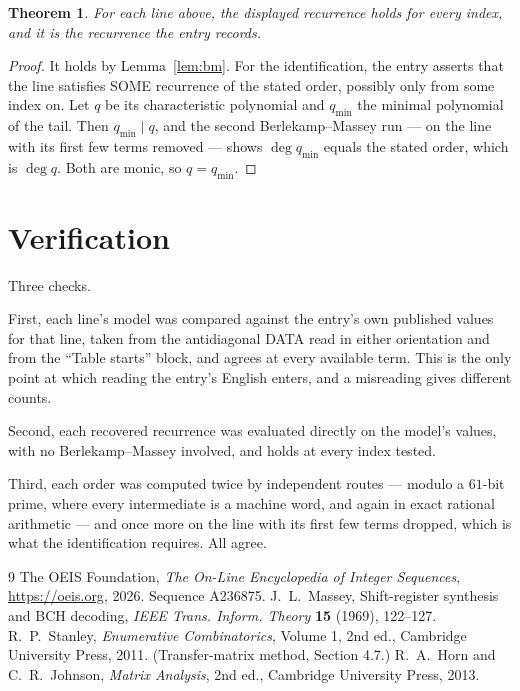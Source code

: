 \documentclass[11pt,a4paper]{article}
\theoremstyle{plain}
\newtheorem{theorem}{Theorem}
\theoremstyle{definition}
\begin{document}
\begin{theorem}
For each line above, the displayed recurrence holds for every index, and it is the recurrence
the entry records.
\end{theorem}

\begin{proof}
It holds by Lemma~\ref{lem:bm}. For the identification, the entry asserts that the line
satisfies SOME recurrence of the stated order, possibly only from some index on. Let $q$ be its
characteristic polynomial and $q_{\min}$ the minimal polynomial of the tail. Then
$q_{\min}\mid q$, and the second Berlekamp--Massey run --- on the line with its first few
terms removed --- shows $\deg q_{\min}$ equals the stated order, which is $\deg q$. Both are
monic, so $q=q_{\min}$.
\end{proof}

\section{Verification}

Three checks.

First, each line's model was compared against the entry's own published values for that line,
taken from the antidiagonal DATA read in either orientation and from the ``Table starts''
block, and agrees at every available term. This is the only point at which reading the entry's
English enters, and a misreading gives different counts.

Second, each recovered recurrence was evaluated directly on the model's values, with no
Berlekamp--Massey involved, and holds at every index tested.

Third, each order was computed twice by independent routes --- modulo a $61$-bit prime, where
every intermediate is a machine word, and again in exact rational arithmetic --- and once more
on the line with its first few terms dropped, which is what the identification requires. All
agree.

\begin{thebibliography}{9}
 The OEIS Foundation, \emph{The On-Line Encyclopedia of Integer
Sequences}, \url{https://oeis.org}, 2026. Sequence A236875.
 J.~L.~Massey, Shift-register synthesis and BCH decoding, \emph{IEEE
Trans. Inform. Theory} \textbf{15} (1969), 122--127.
 R.~P.~Stanley, \emph{Enumerative Combinatorics}, Volume 1, 2nd ed.,
Cambridge University Press, 2011. (Transfer-matrix method, Section 4.7.)
 R.~A.~Horn and C.~R.~Johnson, \emph{Matrix Analysis}, 2nd ed., Cambridge
University Press, 2013.
\end{thebibliography}
\end{document}
